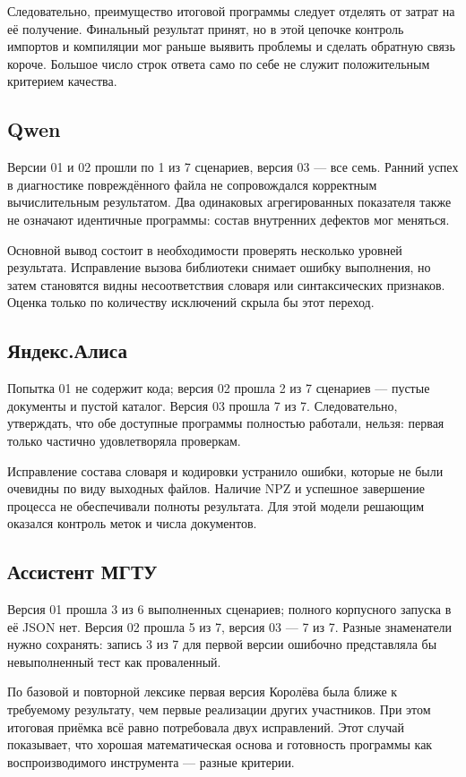 Следовательно, преимущество итоговой программы следует отделять от затрат на её получение. Финальный результат принят, но в этой цепочке контроль импортов и компиляции мог раньше выявить проблемы и сделать обратную связь короче. Большое число строк ответа само по себе не служит положительным критерием качества.

\subsection{Qwen}
Версии 01 и 02 прошли по 1 из 7 сценариев, версия 03 — все семь. Ранний успех в диагностике повреждённого файла не сопровождался корректным вычислительным результатом. Два одинаковых агрегированных показателя также не означают идентичные программы: состав внутренних дефектов мог меняться.

Основной вывод состоит в необходимости проверять несколько уровней результата. Исправление вызова библиотеки снимает ошибку выполнения, но затем становятся видны несоответствия словаря или синтаксических признаков. Оценка только по количеству исключений скрыла бы этот переход.

\subsection{Яндекс.Алиса}
Попытка 01 не содержит кода; версия 02 прошла 2 из 7 сценариев — пустые документы и пустой каталог. Версия 03 прошла 7 из 7. Следовательно, утверждать, что обе доступные программы полностью работали, нельзя: первая только частично удовлетворяла проверкам.

Исправление состава словаря и кодировки устранило ошибки, которые не были очевидны по виду выходных файлов. Наличие NPZ и успешное завершение процесса не обеспечивали полноты результата. Для этой модели решающим оказался контроль меток и числа документов.

\subsection{Ассистент МГТУ}
Версия 01 прошла 3 из 6 выполненных сценариев; полного корпусного запуска в её JSON нет. Версия 02 прошла 5 из 7, версия 03 — 7 из 7. Разные знаменатели нужно сохранять: запись 3 из 7 для первой версии ошибочно представляла бы невыполненный тест как проваленный.

По базовой и повторной лексике первая версия Королёва была ближе к требуемому результату, чем первые реализации других участников. При этом итоговая приёмка всё равно потребовала двух исправлений. Этот случай показывает, что хорошая математическая основа и готовность программы как воспроизводимого инструмента — разные критерии.

